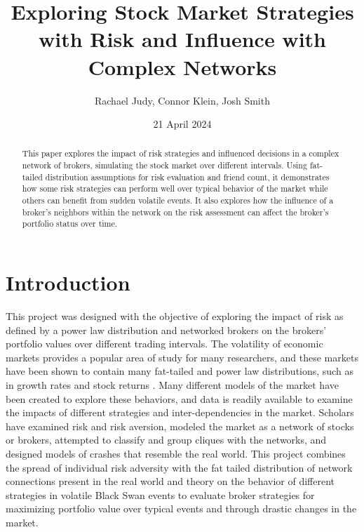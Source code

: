 \documentclass[letterpaper, 11 pt, proceedings]{IEEEtran}
\title{Exploring Stock Market Strategies with Risk and Influence with Complex Networks}
\author{Rachael Judy, Connor Klein, Josh Smith}
\date{21 April 2024}
\begin{document}
	\pgfplotsset{compat=1.18}
	
	\maketitle

	\begin{abstract}
		This paper explores the impact of risk strategies and influenced decisions in a complex network of brokers, simulating the stock market over different intervals. Using fat-tailed distribution assumptions for risk evaluation and friend count, it demonstrates how some risk strategies can perform well over typical behavior of the market while others can benefit from sudden volatile events. It also explores how the influence of a broker's neighbors within the network on the risk assessment can affect the broker's portfolio status over time. 
	\end{abstract}


	\section{Introduction}\label{sec:intro}
	This project was designed with the objective of exploring the impact of risk as defined by a power law distribution and networked brokers on the brokers' portfolio values over different trading intervals. The volatility of economic markets provides a popular area of study for many researchers, and these markets have been shown to contain many fat-tailed and power law distributions, such as in growth rates and stock returns \cite{gabaix_powerlaws}. Many different models of the market have been created to explore these behaviors, and data is readily available to examine the impacts of different strategies and inter-dependencies in the market. Scholars have examined risk and risk aversion, modeled the market as a network of stocks or brokers, attempted to classify and group cliques with the networks, and designed models of crashes that resemble the real world. This project combines the spread of individual risk adversity with the fat tailed distribution of network connections present in the real world and theory on the behavior of different strategies in volatile Black Swan \cite{taleb_antifragile} events to evaluate broker strategies for maximizing portfolio value over typical events and through drastic changes in the market.
	
\end{document}
